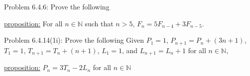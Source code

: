 \documentclass{article}
\theoremstyle{definition}
\newcommand{\N}{\mathbb{N}}
\begin{document}
	\noindent Problem 6.4.6: Prove the following  \vspace{0.3cm}

	\underline{proposition:} For all $n\in\N$ such that $n>5$, $F_n=5F_{n-4}+3F_{n-5}.$

	\vspace{.2cm}

	\vspace{1cm}
%
%
%
%



	\noindent Problem 6.4.14(1i): Prove the following
	Given $P_1=1$, $P_{n+1}=P_n+(3n+1)$, $T_1=1$, $T_{n+1}=T_n+(n+1)$,
	$L_1=1$, and $L_{n+1}=L_n+1$ for all $n\in \N$,
	\vspace{0.3cm}

	\underline{proposition:} $P_n=3T_n-2L_n$ for all $n\in \N$

	\vspace{.2cm}

\end{document}
